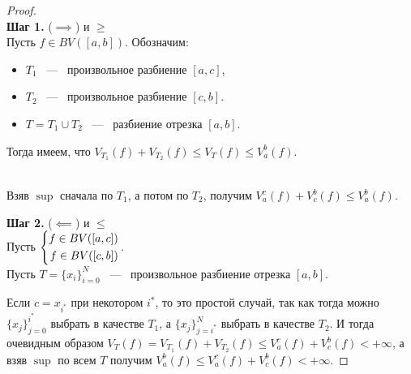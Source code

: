 \begin{proof} \ \\
	\textbf{Шаг 1. } ($\implies$) и $\geq$\\
		
    Пусть $f \in BV([a, b])$. Обозначим:
    \begin{itemize}
        \item $T_1$ ~---~ произвольное разбиение $[a, c]$,
        \item  $T_2$ ~---~ произвольное разбиение $[c, b]$.
        \item $T = T_1 \cup T_2$ ~---~ разбиение отрезка $[a, b]$.
    \end{itemize}
    Тогда имеем, что  $V_{T_1}(f) + V_{T_2}(f) \leq V_T(f) \leq V_a^b (f)$.
    
     \\
    Взяв $\sup$ сначала по $T_1$, а потом по $T_2$, получим $V_a^c (f) + V_c^b (f) \leq V_a^b (f)$.
    
    \textbf{Шаг 2.} ($\impliedby$) и $\leq$ \\
    Пусть $\left\{\begin{aligned}f \in BV([a, c]) \\ f \in BV([c, b])\end{aligned}\right.$.\\
    Пусть $T = \{x_i\}_{i=0}^N$ ~---~ произвольное разбиение отрезка $[a, b]$.
    
    Если $c = x_{i^{*}}$ при некотором $i^{*}$, то это простой случай, так как тогда можно $\{x_j\}_{j=0}^{i^{*}}$ выбрать в качестве $T_1$, а $\{x_j\}_{j=i^{*}}^N$ выбрать в качестве $T_2$. И тогда очевидным образом $V_T(f) = V_{T_1}(f) + V_{T_2} (f) \leq V_a^c(f) + V_c^b (f) < +\infty$, а взяв $\sup$ по всем $T$ получим $V_a^b(f) \leq V_a^c(f) + V_c^b (f) < +\infty$.
    

\end{proof}
